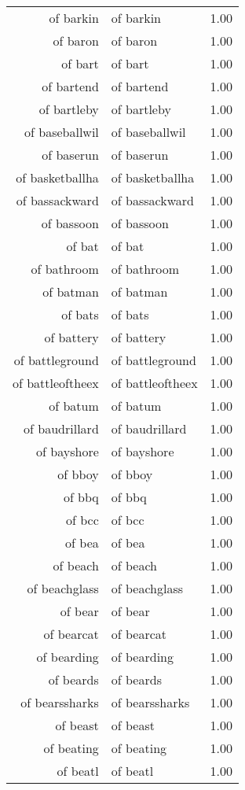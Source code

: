 \begin{table}[ht]
\begin{tabular}{rlr}
  of barkin & of barkin & 1.00 \\ 
  of baron & of baron & 1.00 \\ 
  of bart & of bart & 1.00 \\ 
  of bartend & of bartend & 1.00 \\ 
  of bartleby & of bartleby & 1.00 \\ 
  of baseballwil & of baseballwil & 1.00 \\ 
  of baserun & of baserun & 1.00 \\ 
  of basketballha & of basketballha & 1.00 \\ 
  of bassackward & of bassackward & 1.00 \\ 
  of bassoon & of bassoon & 1.00 \\ 
  of bat & of bat & 1.00 \\ 
  of bathroom & of bathroom & 1.00 \\ 
  of batman & of batman & 1.00 \\ 
  of bats & of bats & 1.00 \\ 
  of battery & of battery & 1.00 \\ 
  of battleground & of battleground & 1.00 \\ 
  of battleoftheex & of battleoftheex & 1.00 \\ 
  of batum & of batum & 1.00 \\ 
  of baudrillard & of baudrillard & 1.00 \\ 
  of bayshore & of bayshore & 1.00 \\ 
  of bboy & of bboy & 1.00 \\ 
  of bbq & of bbq & 1.00 \\ 
  of bcc & of bcc & 1.00 \\ 
  of bea & of bea & 1.00 \\ 
  of beach & of beach & 1.00 \\ 
  of beachglass & of beachglass & 1.00 \\ 
  of bear & of bear & 1.00 \\ 
  of bearcat & of bearcat & 1.00 \\ 
  of bearding & of bearding & 1.00 \\ 
  of beards & of beards & 1.00 \\ 
  of bearssharks & of bearssharks & 1.00 \\ 
  of beast & of beast & 1.00 \\ 
  of beating & of beating & 1.00 \\ 
  of beatl & of beatl & 1.00 \\ 

\end{tabular}
\end{table}
